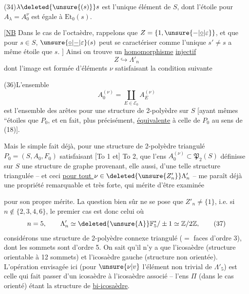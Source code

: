
(34)\qquad $\lambda\deleted{\unsure{(s)}}s$ est l'unique élément de $S$, dont l'étoile pour $A_\lambda=A_0^{\nu}$ est égale à $\mathrm{Et}_0(s)$.

$[$\uline{NB} Dans le cas de l'octaèdre, rappelons que $Z=\{1,\unsure{-|\underline{\circ}|\varepsilon}\}$, et que pour $s\in S$, $\unsure{\underline{\circ}|\underline{-}|\varepsilon}(s)$ peut se caractériser comme l'unique $s'\ne s$   a même étoile que $s$. $]$ Ainsi on trouve un \uline{homomorphisme} \uline{injectif}
\[
Z\hookrightarrow\Lambda'_n\tag*{(35)}
\]
dont l'image est formée d'éléments $\nu$ satisfaisant la condition suivante

(36)\qquad L'ensemble  
\[
A_0^{(\nu)}=\coprod_{E\in\mathcal E_0}A_E^{(\nu)}
\]
est l'ensemble des arêtes pour une structure de 2-polyèdre sur $S$ $[$ayant mêmes ``étoiles que $P_0$, et en fait, plus précisément, \uline{équivalente} à celle de $P_0$ au sens de (18)$]$.

Mais le simple fait déjà,  pour une structure de 2-polyèdre triangulé $P_0=(S,A_0,F_0)$ satisfaisant $[$To 1 et$]$ To 2, que l'ens $A_0^{(\nu)}\subset\mathfrak P_2(S)$ définisse sur $S$ une structure de graphe provenant, elle aussi, d'une telle structure triangulée -- et ceci \uline{pour tout $\nu\in\deleted{\unsure{Z'_n}}\Lambda'_n$} -- me paraît déjà une propriété remarquable et très forte, qui mérite d'être examinée



pour son propre mérite. La question bien sûr ne se pose que $Z'_n\ne\{1\}$, i.e. si $n\notin\{2,3,4,6\}$, le premier cas est donc celui où
\[
n=5,\qquad \Lambda'_{n}\simeq\deleted{\unsure{\Lambda}}\mathbb F_5^*/\pm1\simeq\mathbb Z/2\mathbb Z,\tag*{(37)}
\]
considérons une structure de 2-polyèdre connexe triangulé ($=$ faces d'ordre 3), dont les sommets sont  d'ordre 5. On sait qu'il n'y a que l'icosaèdre (structure orientable à 12 sommets) et l'icosaèdre gauche (structure non orientée). L'opération envisagée ici (pour $\unsure{\nu|v}$ l'élément non trivial de $\Lambda'_5$) est celle qui fait passer d'un icosaèdre à l'icosaèdre associé -- l'ens $\Pi$ (dans le cas orienté) étant la structure de \uline{bi-icosaèdre}.

